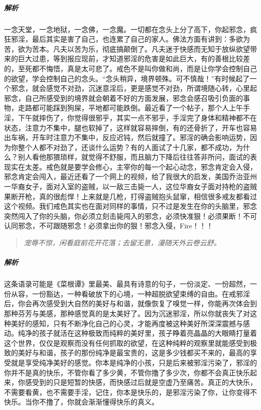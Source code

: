 \subparagraph{解析} 一念天堂，一念地狱，一念佛，一念魔。一切都在念头上分了高下，你起邪念，疯狂邪淫，最后其实是害了自己，也连累了自己的家人。佛法方面有讲到：多欲为苦，欲为苦本。凡夫以苦为乐，彻底搞颠倒了。凡夫迷于快感而无知于放纵欲望带来的巨大过患，等到报应现前，才知道邪淫的危害是如此巨大，有的善根比较差的，至死都不悔悟，真是太可悲了。戒色不是叫你做和尚，而是让你学会控制自己的欲望，学会控制自己的念头。“念头稍异，境界顿殊。可不慎哉！”有时候起了一个邪念，就会感觉不对劲，沉迷意淫后，更是感觉不对劲，所谓境随心转，心里起邪念，自己所感受到的境界就会朝着不好的方面发展，邪念会感召吸引负面的事物，走路都可能踩到狗屎，平地都可能跌倒。最近看了一个帖子，那个人上午手淫，下午就摔伤了，你觉得很邪乎，其实一点不邪乎，手淫完了身体和精神都不在状态，注意力不集中，腿也软掉了，这样就容易摔倒，有的还骨折了，开车也容易出车祸，开车时注意力不集中，反应迟钝，然后就撞了。邪淫的确会影响运势，因为你整个人都不对劲了，还谈什么运势？有的人面试了十几家，都不成功，为什么？别人看他那猥琐样，就觉得不舒服，而且脑力下降后往往答非所问，面试的表现实在太差。戒色就是要学会修心，主宰你的每一个起心动念，邪念肯定会入侵，邪念肯定会闯入，最近还看了一个网上的视频，给了我很大的启发，美国乔治亚州一华裔女子，面对入室的盗贼，以一敌三击毙一人，这位华裔女子面对持枪的盗贼果断开枪，真的很彪悍！上来就是几枪，打得盗贼抱头鼠窜，相信很多戒友都看过这个视频。我们戒色其实也在面对同样的事情，只不过是发生在你的头脑里，邪念突然闯入了你的头脑，你必须立刻击毙闯入的邪念，必须快准狠！必须果断！不可认同邪念，不可跟随邪念！必须拿出你的狠！邪念入侵，Fire！！！

\begin{quote}\it
    宠辱不惊，闲看庭前花开花落；去留无意，漫随天外云卷云舒。
\end{quote}

\subparagraph{解析} 这条语录可能是《菜根谭》里最美、最具有诗意的句子，一份淡定、一份超然，一份从容，一份豁达，一种看破放下的心境，一种超脱欲望束缚的自由。在戒邪淫后，你会再次感受到大自然的美好与和谐，就像恢复了嗅觉一样，你能再次体会到那种芬芳与美感，那种感觉真的是太美好了。因为沉迷邪淫，所以你就丧失了对这种美好的感知，只有不断净化自己的心灵，才能再度被这种美好所深深震撼与感动。纯净的孩子就活在这种极致而纯粹的美好里，孩子睁着亮晶晶的大眼睛打量着这个世界，仅仅是观察而没有任何抓取的欲望，在这种纯粹的观察里就能感受到极致的美好与和谐，孩子的那份纯净是最宝贵的，这是多少钱都买不来的，最高的享受就是享受纯净美好的感觉。你本是纯净的小孩，只是后来被邪淫污染了，邪淫的你并不是真的快乐，不管你看了多少黄，不管你撸了多少次，你都不会真正快乐起来，你感受到的只是短暂的快感，而快感过后就是空虚乃至痛苦。真正的大快乐，不需要看黄，也不需要手淫，记住，你本是快乐的，是邪淫污染了你，让你变得不快乐。当你不撸了，你就会渐渐懂得快乐的真义。

